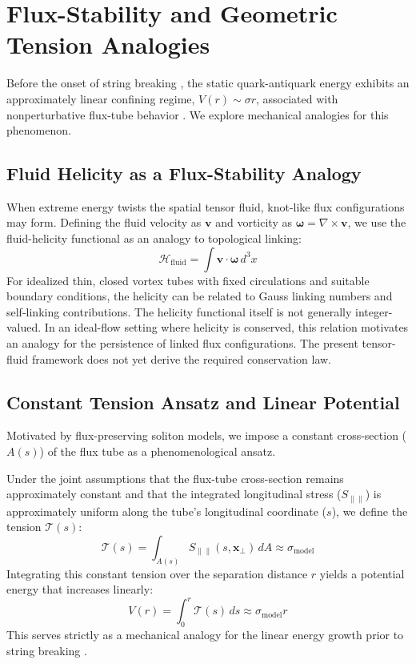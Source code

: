 \documentclass[reprint,amsmath,amssymb,aps,prd]{revtex4-2}
\begin{document}
\section{Flux-Stability and Geometric Tension Analogies}

Before the onset of string breaking \cite{Bali2005}, the static quark-antiquark energy exhibits an approximately linear confining regime, $V(r) \sim \sigma r$, associated with nonperturbative flux-tube behavior \cite{Wilson1974}. We explore mechanical analogies for this phenomenon.

\subsection{Fluid Helicity as a Flux-Stability Analogy}
When extreme energy twists the spatial tensor fluid, knot-like flux configurations may form. Defining the fluid velocity as $\mathbf{v}$ and vorticity as $\boldsymbol{\omega} = \nabla \times \mathbf{v}$, we use the fluid-helicity functional \cite{Moffatt1969} as an analogy to topological linking:
\begin{equation}
\mathcal{H}_{\mathrm{fluid}} = \int \mathbf{v} \cdot \boldsymbol{\omega} \, d^3x
\end{equation}
For idealized thin, closed vortex tubes with fixed circulations and suitable boundary conditions, the helicity can be related to Gauss linking numbers and self-linking contributions. The helicity functional itself is not generally integer-valued. In an ideal-flow setting where helicity is conserved, this relation motivates an analogy for the persistence of linked flux configurations. The present tensor-fluid framework does not yet derive the required conservation law.

\subsection{Constant Tension Ansatz and Linear Potential}
Motivated by flux-preserving soliton models, we impose a constant cross-section ($A(s)$) of the flux tube as a phenomenological ansatz. 

Under the joint assumptions that the flux-tube cross-section remains approximately constant and that the integrated longitudinal stress ($S_{\parallel\parallel}$) is approximately uniform along the tube's longitudinal coordinate ($s$), we define the tension $\mathcal{T}(s)$:
\begin{equation}
\mathcal{T}(s) = \int_{A(s)} S_{\parallel\parallel}(s, \mathbf{x}_\perp) \, dA \approx \sigma_{\mathrm{model}}
\end{equation}
Integrating this constant tension over the separation distance $r$ yields a potential energy that increases linearly:
\begin{equation}
V(r) = \int_0^r \mathcal{T}(s) \, ds \approx \sigma_{\mathrm{model}} r
\end{equation}
This serves strictly as a mechanical analogy for the linear energy growth prior to string breaking \cite{Bali2005}.
\end{document}
